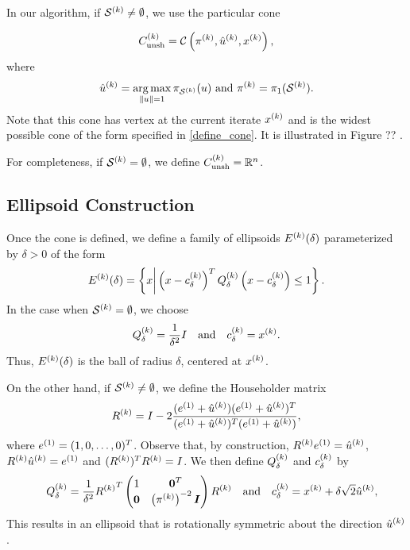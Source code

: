\documentclass{article}
\begin{document}
In our algorithm, if $\mathcal{S}^{(k)} \ne \emptyset$, we use the particular cone

\[ {C^{(k)}_{\textrm{unsh}}} = \mathcal C\left(\pi^{(k)},  \hat{u}^{(k)},  x^{(k)} \right), \]
where 
\[ \hat{u}^{(k)} =  \operatorname*{arg\,max}_{\|u\|=1} \pi_{\mathcal{S}^{(k)}}(u) \ \mbox{and} \ \pi^{(k)} = {\pi_1}(\mathcal{S}^{(k)}).\]
%
Note that this cone has vertex at the current iterate $x^{(k)}$ and is the widest possible cone of the form specified in \cref{define_cone}.    It is illustrated in Figure ??  .

For completeness, if $\mathcal{S}^{(k)} = \emptyset$, we define ${C^{(k)}_{\textrm{unsh}}} = \mathbb R^n$.
\subsection{Ellipsoid Construction}
\label{ellipsoid_construction}
Once the cone is defined,  we define a family of ellipsoids ${E^{(k)}}(\delta)$ parameterized by $\delta>0$ 
of the form
\begin{equation}
\label{define_linear_nontrival_ellipsoid_delta}
{E^{(k)}}(\delta) = \left\{x \bigg| \left(x-c^{(k)}_{\delta}\right)^T{Q^{(k)}_{\delta}}\left(x-c^{(k)}_{\delta}\right) \le 1\right\}.
\end{equation}
In the case when $\mathcal{S}^{(k)} = \emptyset$,  we choose
\begin{equation}\label{define_Qc_delta_empty}
{Q^{(k)}_{\delta}} = \frac{1}{\delta^2} I \quad \mbox{and}\quad c^{(k)}_{\delta} = x^{(k)}.
\end{equation}
Thus, ${E^{(k)}}(\delta)$ is the ball of radius $\delta$, centered at $x^{(k)}$.

On the other hand, if $\mathcal{S}^{(k)} \ne \emptyset$, we
define the 
Householder matrix 
\begin{align}
{R^{(k)}} = I - 2\frac{({e^{(1)}} + {{{\hat u}^{(k)}}})({e^{(1)}} +{{{\hat u}^{(k)}}})^T}{({e^{(1)}} +{{{\hat u}^{(k)}}})^T({e^{(1)}} +{{{\hat u}^{(k)}}})}, \label{define_r} 
\end{align}
where ${e^{(1)}}=(1,0,\ldots,0)^T$.  Observe that, by construction, ${R^{(k)}} {e^{(1)}}={{{\hat u}^{(k)}}}$, ${R^{(k)}} {{{\hat u}^{(k)}}} = {e^{(1)}}$ and $({R^{(k)}})^T{R^{(k)}}=I$.
We then define ${Q^{(k)}_{\delta}}$ and $c^{(k)}_{\delta}$ by
\begin{align*}
\quad {Q^{(k)}_{\delta}} = \frac {1} {\delta^2} {R^{(k)}}^T \begin{pmatrix}
1 & \boldsymbol0^T \\
\boldsymbol 0 & \left({\pi^{(k)}}\right)^{-2} \boldsymbol I \\
\end{pmatrix} {R^{(k)}}
\quad
\textrm{and}
\quad
c^{(k)}_{\delta} = x^{(k)}+\delta \sqrt{2} {{{\hat u}^{(k)}}},
\end{align*}
This results in an ellipsoid that is rotationally symmetric about the direction ${{{\hat u}^{(k)}}}$.
\end{document}
